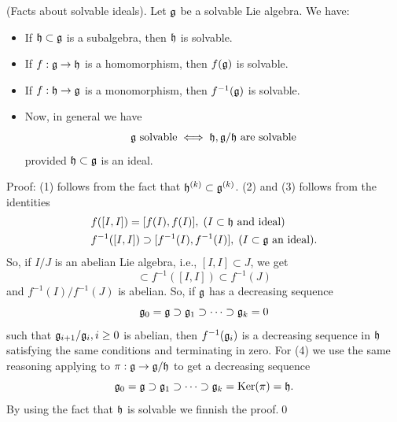 \begin{dang}
    \begin{lemma}
        (Facts about solvable ideals). Let $\mathfrak{g}$ be a solvable Lie algebra. We have:
        \begin{itemize}
            \item[(1)] If $\mathfrak{h}\subset\mathfrak{g}$ is a subalgebra, then $\mathfrak{h}$ is solvable.
            \item[(2)] If $f:\mathfrak{g}\to\mathfrak{h}$ is a homomorphism, then $f(\mathfrak{g})$ is solvable.
            \item[(3)] If $f:\mathfrak{h}\to\mathfrak{g}$ is a monomorphism, then $f^{-1}(\mathfrak{g})$ is solvable.
            \item[(4)] Now, in general we have 
            \begin{equation}
                \mathfrak{g}\text{ solvable}\iff \mathfrak{h},\mathfrak{g}/\mathfrak{h}\text{ are solvable}
            \end{equation}
            provided $\mathfrak{h}\subset\mathfrak{g}$ is an ideal.
        \end{itemize}
    \end{lemma}
\end{dang}
Proof: (1) follows from the fact that $\mathfrak{h}^{(k)}\subset \mathfrak{g}^{(k)}$. (2) and (3) follows from the identities
\begin{equation}
    \begin{split}
        &f([I,I])=[f(I),f(I)],\;(I\subset\mathfrak{h} \text{ and ideal})\\
        &f^{-1}([I,I])\supset [f^{-1}(I),f^{-1}(I)],\; (I\subset \mathfrak{g} \text{ an ideal}).
    \end{split}
\end{equation}
So, if $I/J$ is an abelian Lie algebra, i.e., $[I,I]\subset J$, we get
\begin{equation}
    [f^{-1}(I),f^{-1}(I)]\subset f^{-1}([I,I])\subset f^{-1}(J)
\end{equation}
and $f^{-1}(I)/f^{-1}(J)$ is abelian. So, if $\mathfrak{g}$ has a decreasing sequence 
\begin{equation}
    \mathfrak{g}_0=\mathfrak{g}\supset\mathfrak{g}_1\supset\cdots\supset\mathfrak{g}_k=0
\end{equation}
such that $\mathfrak{g}_{i+1}/\mathfrak{g}_i,i\geq0$ is abelian, then $f^{-1}(\mathfrak{g}_i)$ is a decreasing sequence in $\mathfrak{h}$ 
satisfying the same conditions and terminating in zero. For (4) we use the same reasoning applying to 
$\pi:\mathfrak{g}\rightarrow\mathfrak{g}/\mathfrak{h}$ to get a decreasing sequence 
\begin{equation}
    \mathfrak{g}_0=\mathfrak{g}\supset\mathfrak{g}_1\supset\cdots\supset\mathfrak{g}_k=\text{Ker}(\pi)=\mathfrak{h}.
\end{equation}
By using the fact that $\mathfrak{h}$ is solvable we finnish the proof.\qed

